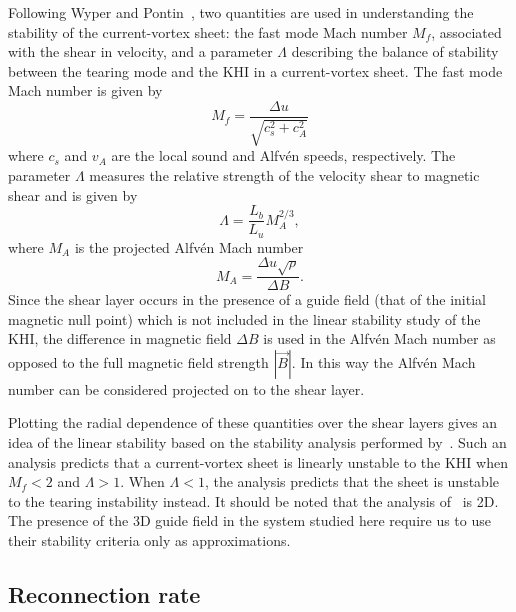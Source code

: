 \label{sec:stability_measures}

Following Wyper and Pontin~\cite{wyperKelvinHelmholtzInstabilityCurrentvortex2013}, two quantities are used in understanding the stability of the current-vortex sheet: the fast mode Mach number $M_f$, associated with the shear in velocity, and a parameter $\Lambda$ describing the balance of stability between the tearing mode and the KHI in a current-vortex sheet. The fast mode Mach number is given by
\begin{equation}
  \label{eq:mach_numbers}
  M_f = \frac{\Delta u}{\sqrt{c_s^2 + c_A^2}}
\end{equation}
where $c_s$ and $v_A$ are the local sound and Alfv\'en speeds, respectively. The parameter $\Lambda$ measures the relative strength of the velocity shear to magnetic shear and is given by
\begin{equation}
  \label{eq:khi_stability_param}
  \Lambda = \frac{L_b}{L_u} M_A^{2/3},
\end{equation}
where $M_A$ is the projected Alfv\'en Mach number
\begin{equation}
  \label{eq:alfven_mach_number}
M_A = \frac{\Delta u \sqrt{\rho}}{\Delta B}.
\end{equation}
Since the shear layer occurs in the presence of a guide field (that of the initial magnetic null point) which is not included in the linear stability study of the KHI, the difference in magnetic field $\Delta B$ is used in the Alfv\'en Mach number as opposed to the full magnetic field strength $|\vec{B}|$. In this way the Alfv\'en Mach number can be considered projected on to the shear layer. 

Plotting the radial dependence of these quantities over the shear layers gives an idea of the linear stability based on the stability analysis performed by~\cite{einaudiResistiveInstabilitiesFlowing1986}. Such an analysis predicts that a current-vortex sheet is linearly unstable to the KHI when $M_f < 2$ and $\Lambda > 1$. When $\Lambda < 1$, the analysis predicts that the sheet is unstable to the tearing instability instead. It should be noted that the analysis of~\cite{einaudiResistiveInstabilitiesFlowing1986} is 2D. The presence of the 3D guide field in the system studied here require us to use their stability criteria only as approximations.

\subsection{Reconnection rate}

